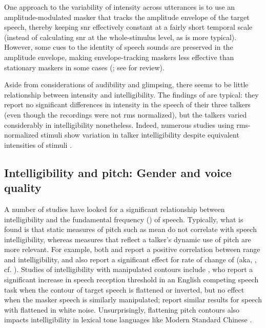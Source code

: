 One approach to the variability of intensity across utterances is to use an amplitude-modulated masker that tracks the amplitude envelope of the target speech, thereby keeping \ac{snr} effectively constant at a fairly short temporal scale (instead of calculating \ac{snr} at the whole-stimulus level, as is more typical).  However, some cues to the identity of speech sounds are preserved in the amplitude envelope, making envelope-tracking maskers less effective than stationary maskers in some cases (\citealp{HoriiEtAl1971, VanTasellEtAl1987, BashfordEtAl1996}; see \citealp{Wright2004b} for review).

Aside from considerations of audibility and glimpsing, there seems to be little relationship between intensity and intelligibility.  The findings of \citet{BondMoore1994} are typical: they report no significant differences in intensity in the speech of their three talkers (even though the recordings were not \ac{rms} normalized), but the talkers varied considerably in intelligibility nonetheless.  Indeed, numerous studies using \ac{rms}-normalized stimuli show variation in talker intelligibility despite equivalent intensities of stimuli \citep[is one example]{McCloyEtAl2013}.

\subsection[Intelligibility and pitch]{Intelligibility and pitch: Gender and voice quality\label{sec:IntelPitch}}
A number of studies have looked for a significant relationship between intelligibility and the fundamental frequency (\fo) of speech.  Typically, what is found is that static measures of pitch such as mean \fo{} do not correlate with speech intelligibility, whereas measures that reflect a talker’s dynamic use of pitch are more relevant.  For example, both \citet{BradlowEtAl1996} and \citet{McCloyEtAl2013} report a positive correlation between \fo{} range and intelligibility, and \citeauthor{McCloyEtAl2013} also report a significant effect for rate of change of \fo{} (\ac{aka}, , cf. \citealt{GauthierEtAl2007b, GauthierEtAl2007a, GauthierEtAl2009}).  Studies of intelligibility with manipulated \fo{} contours include \citet{BinnsCulling2007}, who report a significant increase in speech reception threshold in an English competing speech task when the \fo{} contour of target speech is flattened or inverted, but no effect when the masker speech is similarly manipulated; \citet{WatsonSchlauch2008} report similar results for speech with flattened \fo{} in white noise.  Unsurprisingly, flattening pitch contours also impacts intelligibility in lexical tone languages like Modern Standard Chinese \citep{PatelEtAl2010}.

